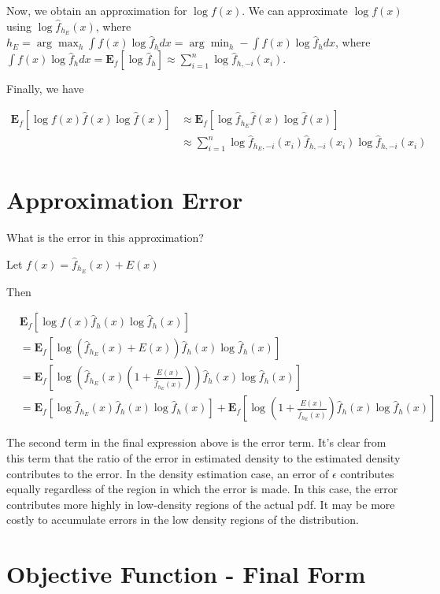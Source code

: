 \documentclass{amsart}
\begin{document}
Now, we obtain an approximation for $ \log f(x) $. We can approximate $ \log f(x) $ using $ \log \hat{f}_{h_E}(x) $, where $ h_E = \arg \max_h \int f(x) \log \hat{f}_h dx = \arg \min_h - \int f(x) \log \hat{f}_h dx $, where $ \int f(x) \log \hat{f}_h dx = \mathbf{E}_f[\log \hat{f}_h] \approx \sum_{i=1}^n \log \hat{f}_{h,-i}(x_i) $.



Finally, we have

\begin{align*}
\mathbf{E}_{f}[\log f(x) \hat{f}(x) \log \hat{f}(x)] & \approx \mathbf{E}_f[ \log \hat{f}_{h_E} \hat{f}(x) \log \hat{f}(x)]\\
& \approx \sum_{i=1}^n \log \hat{f}_{h_E,-i}(x_i) \hat{f}_{h,-i}(x_i) \log \hat{f}_{h,-i}(x_i)
\end{align*}

\section{Approximation Error}

What is the error in this approximation?

Let $ f(x) = \hat{f}_{h_E}(x) + E(x) $

Then

\begin{align*}
& \mathbf{E}_f[ \log f(x) \hat{f}_h(x) \log \hat{f}_h(x)]\\
& = \mathbf{E}_f[ \log (\hat{f}_{h_E}(x) + E(x)) \hat{f}_h(x) \log \hat{f}_h(x)]\\
& = \mathbf{E}_f[ \log (\hat{f}_{h_E}(x) (1 + \frac{E(x)}{\hat{f}_{h_E}(x)})) \hat{f}_h(x) \log \hat{f}_h(x)]\\
& = \mathbf{E}_f[ \log \hat{f}_{h_E}(x) \hat{f}_h(x) \log \hat{f}_h(x)] + \mathbf{E}_f[ \log (1 + \frac{E(x)}{\hat{f}_{h_E}(x)}) \hat{f}_h(x) \log \hat{f}_h(x)]
\end{align*}

The second term in the final expression above is the error term. It's clear from this term that the ratio of the error in estimated density to the estimated density contributes to the error. In the density estimation case, an error of $ \epsilon $ contributes equally regardless of the region in which the error is made. In this case, the error contributes more highly in low-density regions of the actual pdf. It may be more costly to accumulate errors in the low density regions of the distribution.


\section{Objective Function - Final Form}
\end{document}
